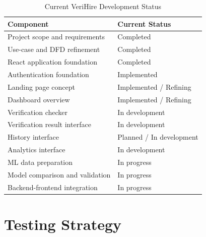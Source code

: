 \documentclass[12pt,a4paper]{report}
\begin{document}
\begin{table}[h]
\centering

\begin{tabular}{p{}p{}}

\toprule

\textbf{Component} & \textbf{Current Status} \\

\midrule

Project scope and requirements & Completed \\

Use-case and DFD refinement & Completed \\

React application foundation & Completed \\

Authentication foundation & Implemented \\

Landing page concept & Implemented / Refining \\

Dashboard overview & Implemented / Refining \\

Verification checker & In development \\

Verification result interface & In development \\

History interface & Planned / In development \\

Analytics interface & In development \\

ML data preparation & In progress \\

Model comparison and validation & In progress \\

Backend-frontend integration & In progress \\

\bottomrule

\end{tabular}

\caption{Current VeriHire Development Status}

\label{tab:status}

\end{table}


\section{Testing Strategy}
\end{document}
